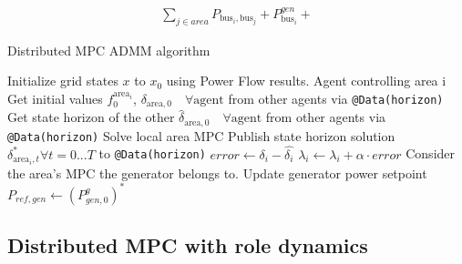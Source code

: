 \documentclass{article}
\begin{document}
\begin{align}
    \sum_{j \in area} P_{\text{bus}_i, \text{bus}_j} + P^{gen}_{\text{bus}_i} +
\end{align}

\begin{algorithm}
    \caption{Distributed MPC ADMM algorithm}
    \label{algo:ADMM}
    \begin{algorithmic}[1]
        \State Initialize grid states $x$ to $x_0$ using Power Flow results.
                \State Agent controlling area i
                \State Get initial values $f_0^{\text{area}_i}$, $\delta_{\text{area}, 0} \quad \forall \text{agent}$ from other agents via \texttt{@Data(horizon)}
                \State Get state horizon of the other $\hat{\delta}_{\text{area}, 0} \quad \forall \text{agent}$ from other agents via \texttt{@Data(horizon)}
                \State Solve local area MPC
                \State Publish state horizon solution $\delta_{\text{area}_i, t}^* \forall t=0...T$ to \texttt{@Data(horizon)}
                \State $error \gets \delta_{i} - \hat{\delta_{i}}$
                \State $\lambda_{i} \gets \lambda_{i} + \alpha \cdot error$
            \EndFor
        \EndWhile
            \State Consider the area's MPC the generator belongs to.
            \State Update generator power setpoint $P_{ref, gen} \gets (P^{g}_{gen, 0})^*$
        \EndFor
    \end{algorithmic}
\end{algorithm}

\subsection{Distributed MPC with role dynamics}

\nocite{*}
\printbibliography
\end{document}
